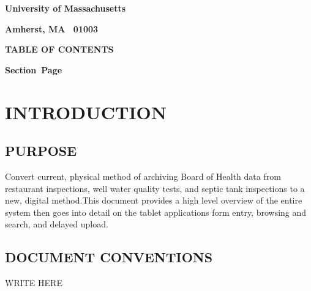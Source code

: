 \documentclass[twoside,letterpaper]{article}
\begin{document}
{\centering{}\bfseries\color{black}
University of Massachusetts
\par}

{\centering{}\bfseries\color{black}
Amherst, MA \ 01003
\par}



{\centering{}\bfseries\color{black}
TABLE OF CONTENTS
\par}


\bigskip

{\bfseries\color{black}
Section\ \hfill  Page}

\setcounter{tocdepth}{9}
\renewcommand\contentsname{}
\tableofcontents

\bigskip

\clearpage\clearpage\setcounter{page}{1}\pagestyle{Convertii}
\section[INTRODUCTION]{\rmfamily\bfseries\color{black}
INTRODUCTION}

\subsection[PURPOSE]{\rmfamily\bfseries\color{black}
PURPOSE}
{\rmfamily\color{black}
Convert current, physical method of archiving Board of Health data from restaurant inspections, well water quality tests, and septic tank inspections to a new, digital method.This document provides a high level overview of the entire system then goes into detail on the tablet applications form entry, browsing and search, and delayed upload.
}


\subsection[DOCUMENT CONVENTIONS]{\rmfamily\bfseries\color{black}
DOCUMENT CONVENTIONS}
{\rmfamily\color{black}
WRITE HERE}
\end{document}
